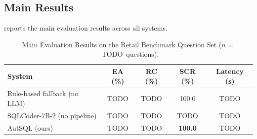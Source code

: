 \documentclass[conference]{IEEEtran}
\begin{document}




\subsection{Main Results}
\label{sec:eval:main}

 reports the main evaluation results across
all systems.

\begin{table}[t]
  \centering
  \caption{Main Evaluation Results on the Retail Benchmark Question Set
           ($n = $~TODO~questions).}
  \label{tab:main-results}
  \begin{tabular}{@{}lcccc@{}}
    \toprule
    \textbf{System} & \textbf{EA (\%)} & \textbf{RC (\%)} & \textbf{SCR (\%)} & \textbf{Latency (s)} \\
    \midrule
    Rule-based fallback (no LLM)     & TODO & TODO & 100.0 & TODO \\
    SQLCoder-7B-2 (no pipeline)      & TODO & TODO & TODO  & TODO \\
    AutSQL (ours)                    & TODO & TODO & \textbf{100.0} & TODO \\
    \bottomrule
  \end{tabular}
\end{table}
\end{document}
